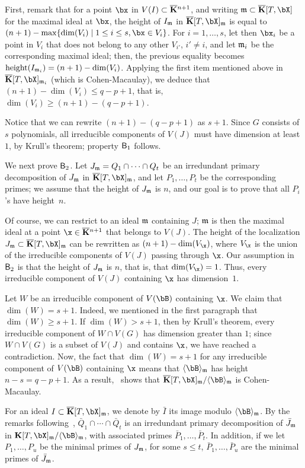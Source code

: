 \documentclass[12pt]{article}
\begin{document}
First, remark that for a point $\bx$ in $V(I)\subset \overline{\mathbf{K}}{}^{n+1}$,
and writing $\m \subset \KKbar[T,\bX]$ for the maximal ideal at $\bx$,
the height of $I_{\mathfrak{m}}$ in $\KKbar[T,\bX]_\m$ is equal to $(n+1)-\max\{
\dim(V_i) \mid 1 \le i \le s, \bx \in V_i\}$. For $i=1,\dots,s$, let
then $\bx_i$ be a point in $V_i$ that does not belong to any other
$V_{i'}$, $i' \ne i$, and let $\mathfrak{m}_i$ be the corresponding maximal
ideal; then, the previous equality becomes ${\rm
  height}(I_{\mathfrak{m}_i})=(n+1)-\dim(V_i)$.  Applying the first item
mentioned above in $\KKbar[T,\bX]_{\m_i}$ (which is Cohen-Macaulay),
we deduce that $(n+1)-\dim(V_i) \le q-p+1$, that is, $\dim(V_i) \ge
(n+1) -(q-p+1)$.

Notice that we can rewrite $(n+1)-(q-p+1)$ as $s+1$.  Since $G$
consists of $s$ polynomials, all irreducible components of $V(J)$ must
have dimension at least $1$, by Krull's theorem;  property
$\mathsf{B}_1$ follows.

We next prove $\mathsf{B}_2$. Let $J_{\mathfrak{m}}=Q_1 \cap \cdots \cap Q_t$ be an
irredundant primary decomposition of $J_{\mathfrak{m}}$ in $\KKbar[T,\bX]_\m$, and
let $P_1,\dots,P_t$ be the corresponding primes; we assume that the
height of $J_{\mathfrak{m}}$ is $n$, and our goal is to prove that all $P_i$'s
have height~$n$.

Of course, we can restrict to an ideal $\mathfrak{m}$ containing $J$; $\mathfrak{m}$ is
then the maximal ideal at a point $\x \in \KKbar{}^{n+1}$ that belongs
to $V(J)$. The height of the localization
$J_\m \subset \KKbar[T,\bX]_\m$ can be rewritten as
$(n+1)-\dim(V_\x)$, where $V_\x$ is the union of the irreducible
components of $V(J)$ passing through $\x$. Our assumption in $\mathsf{B}_2$
is that the height of $J_{\mathfrak{m}}$ is $n$, that is, that
$\dim(V_\x)=1$. Thus, every irreducible component of $V(J)$ containing
$\x$ has dimension~$1$.

Let $W$ be an irreducible component of $V(\bB)$ containing $\x$.  We
claim that $\dim(W)=s+1$. Indeed, we mentioned in the first paragraph
that $\dim(W) \ge s+1$. If $\dim(W) > s+1$, then by Krull's theorem,
every irreducible component of $W \cap V(G)$ has dimension greater
than $1$; since $W \cap V(G)$ is a subset of $V(J)$ and contains $\x$,
we have reached a contradiction. Now, the fact that $\dim(W)=s+1$ for
any irreducible component of $V(\bB)$ containing $\x$ means that
$\langle \bB \rangle_\m$ has height $n-s=q-p+1$.  As a
result,~\cite[Theorem~18.18]{Eisenbud95} shows that
$\KKbar[T,\bX]_\m/\langle \bB \rangle_\m$ is Cohen-Macaulay.

For an ideal $I \subset \KKbar[T,\bX]_\m$, we denote by $\bar I$ its
image modulo $\langle \bB \rangle_\m$.  By the remarks
following~\cite[Theorem~IV.5.9]{ZaSa58},
$\bar Q_1 \cap \cdots \cap \bar Q_t$ is an irredundant primary
decomposition of $\bar J_{\mathfrak{m}}$ in
$\KK[T,\bX]_\m/\langle \bB \rangle_\m$, with associated primes
$\bar P_1,\dots,\bar P_t$. In addition, if we let $P_1,\dots,P_u$ be
the minimal primes of $J_{\mathfrak{m}}$, for some $s \le t$,
$\bar P_1,\dots,\bar P_u$ are the minimal primes of $\bar J_{\mathfrak{m}}$.
\end{document}
